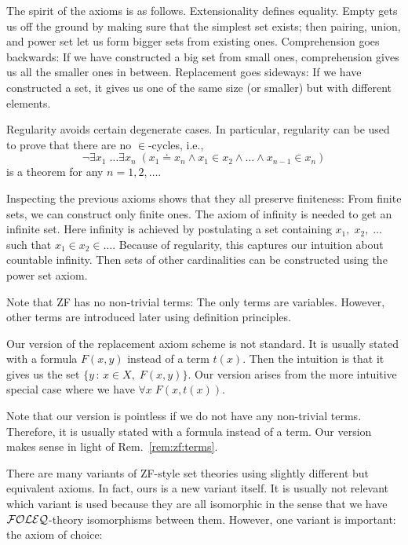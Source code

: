 The spirit of the axioms is as follows. Extensionality defines equality. Empty gets us off the ground by making sure that the simplest set exists; then pairing, union, and power set let us form bigger sets from existing ones. Comprehension goes backwards: If we have constructed a big set from small ones, comprehension gives us all the smaller ones in between. Replacement goes sideways: If we have constructed a set, it gives us one of the same size (or smaller) but with different elements.

Regularity avoids certain degenerate cases. In particular, regularity can be used to prove that there are no $\in$-cycles, i.e.,
 \[\neg\exists x_1\;\ldots\exists x_n\;(x_1\doteq x_n\wedge x_1\in x_2\wedge\ldots\wedge x_{n-1}\in x_n)\]
 is a theorem for any $n=1,2,\ldots$.

Inspecting the previous axioms shows that they all preserve finiteness: From finite sets, we can construct only finite ones. The axiom of infinity is needed to get an infinite set. Here infinity is achieved by postulating a set containing $x_1,\;x_2,\;\ldots$ such that $x_1\in x_2\in\ldots$. Because of regularity, this captures our intuition about countable infinity. Then sets of other cardinalities can be constructed using the power set axiom.

\begin{remark}\label{rem:zf:terms}
Note that ZF has no non-trivial terms: The only terms are variables. However, other terms are introduced later using definition principles.
\end{remark}

\begin{remark}
Our version of the replacement axiom scheme is not standard. It is usually stated with a formula $F(x,y)$ instead of a term $t(x)$. Then the intuition is that it gives us the set $\{y\,:\,x\in X,\;F(x,y)\}$. Our version arises from the more intuitive special case where we have $\forall x\;F(x,t(x))$.

Note that our version is pointless if we do not have any non-trivial terms. Therefore, it is usually stated with a formula instead of a term. Our version makes sense in light of Rem.~\ref{rem:zf:terms}.
\end{remark}

There are many variants of ZF-style set theories using slightly different but equivalent axioms. In fact, ours is a new variant itself. It is usually not relevant which variant is used because they are all isomorphic in the sense that we have ${\mathcal{FOLEQ}}$-theory isomorphisms between them. However, one variant is important: the axiom of choice:

